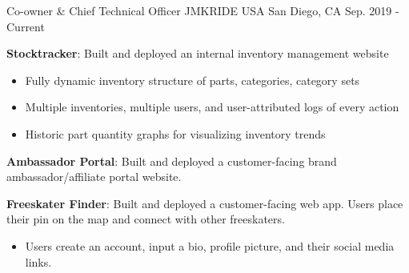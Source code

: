 

\begin{cventries}

  \cventry
    {Co-owner \& Chief Technical Officer} %
    {JMKRIDE USA} %
    {San Diego, CA} %
    {Sep. 2019 - Current} %
    {
      \begin{cvitems} %
        \item {
          \textbf{Stocktracker}: Built and deployed an internal inventory management website 
          \newline{}
          \begin{itemize}[leftmargin=0.5cm]
            \item{Fully dynamic inventory structure of parts, categories, category sets}
            \item{Multiple inventories, multiple users, and user-attributed logs of every action}
            \item{Historic part quantity graphs for visualizing inventory trends}
          \end{itemize}
        }
        \item {
          \textbf{Ambassador Portal}: Built and deployed a customer-facing
          brand ambassador/affiliate portal website.
          \newline{}
        }
        \item{
          \textbf{Freeskater Finder}: Built and deployed a customer-facing web
          app. Users place their pin on the map and connect with other
          freeskaters.
          \newline{}
          \begin{itemize}[leftmargin=0.5cm]
            \item{
              Users create an account, input a bio, profile picture, and their
              social media links.
}
\end{itemize}}
\end{cvitems}}
\end{cventries}
